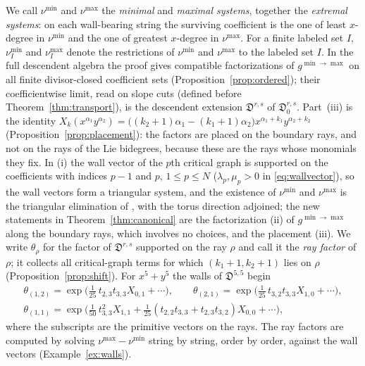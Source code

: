 \documentclass[11pt]{amsart}
\theoremstyle{definition}
\theoremstyle{remark}
\newcommand{\Dscr}{\mathfrak{D}}
\begin{document}
We call $\nu^{\min}$ and $\nu^{\max}$ the \emph{minimal} and \emph{maximal
systems}, together the \emph{extremal systems}: on each wall-bearing string
the surviving coefficient is the one of least $x$-degree in $\nu^{\min}$ and
the one of greatest $x$-degree in $\nu^{\max}$.  For a finite labeled set $I$,
$\nu^{\min}_I$ and $\nu^{\max}_I$ denote the restrictions of $\nu^{\min}$ and
$\nu^{\max}$ to the labeled set $I$.  In the full descendent algebra the
proof gives compatible factorizations of $g^{\min\to\max}$ on all finite
divisor-closed coefficient sets (Proposition~\ref{prop:ordered}); their
coefficientwise limit, read on slope cuts (defined before
Theorem~\ref{thm:transport}), is the descendent extension
$\Dscr^{r,s}$ of $\Dscr^{r,s}_{0}$.  Part~(iii) is the identity
$X_{k}(x^{\alpha_1}y^{\alpha_2})=\bigl((k_2{+}1)\alpha_1-(k_1{+}1)\alpha_2\bigr)
x^{\alpha_1+k_1}y^{\alpha_2+k_2}$ (Proposition~\ref{prop:placement}): the
factors are placed on the boundary rays, and not on the rays of the Lie
bidegrees, because these are the rays whose monomials they fix.  In (i) the
wall vector of the $p$th critical graph is supported on the coefficients
with indices $p-1$ and $p$, $1\le p\le N$ ($\lambda_p,\mu_p>0$ in
\eqref{eq:wallvector}), so the wall vectors form a triangular system, and the
existence of $\nu^{\min}$ and $\nu^{\max}$ is the triangular elimination of
\cite[proof of Thm.~4.27, Step~3]{GKT}, with the torus direction adjoined;
the new statements in Theorem~\ref{thm:canonical} are the factorization (ii)
of $g^{\min\to\max}$ along the boundary rays, which involves no choices, and
the placement (iii).  We write $\theta_{\rho}$ for
the factor of $\Dscr^{r,s}$ supported on the ray $\rho$ and call it the
\emph{ray factor} of $\rho$; it collects all critical-graph terms for which
$(k_{1}{+}1,k_{2}{+}1)$ lies on $\rho$ (Proposition~\ref{prop:shift}).  For
$x^{5}+y^{5}$ the walls of $\Dscr^{5,5}$ begin
\begin{gather*}
\theta_{(1,2)}=\exp\bigl(\tfrac1{25}\,t_{2,3}t_{3,3}X_{0,1}+\cdots\bigr),\qquad
\theta_{(2,1)}=\exp\bigl(\tfrac1{25}\,t_{3,2}t_{3,3}X_{1,0}+\cdots\bigr),\\
\theta_{(1,1)}=\exp\bigl(\tfrac1{50}\,t_{3,3}^{2}X_{1,1}
+\tfrac1{25}(t_{2,2}t_{3,3}+t_{2,3}t_{3,2})X_{0,0}+\cdots\bigr),
\end{gather*}
where the subscripts are the primitive vectors on the rays.  The ray
factors are computed by solving $\nu^{\max}-\nu^{\min}$ string by string,
order by order, against the wall vectors (Example~\ref{ex:walls}).
\end{document}

